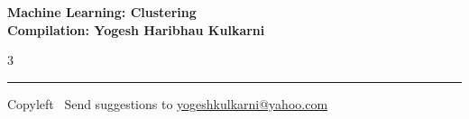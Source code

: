 \documentclass[8pt,landscape]{article}
\begin{document}
\footnotesize


\begin{center}
\Large{\textbf{Machine Learning: Clustering\\ Compilation: Yogesh Haribhau Kulkarni}}
\end{center}

\begin{multicols}{3}

\end{multicols}

\rule{\linewidth}{0.25pt}
\scriptsize
Copyleft \textcopyleft\  Send suggestions to
\href{http://www.yogeshkulkarni.com}{yogeshkulkarni@yahoo.com}
\end{document}
